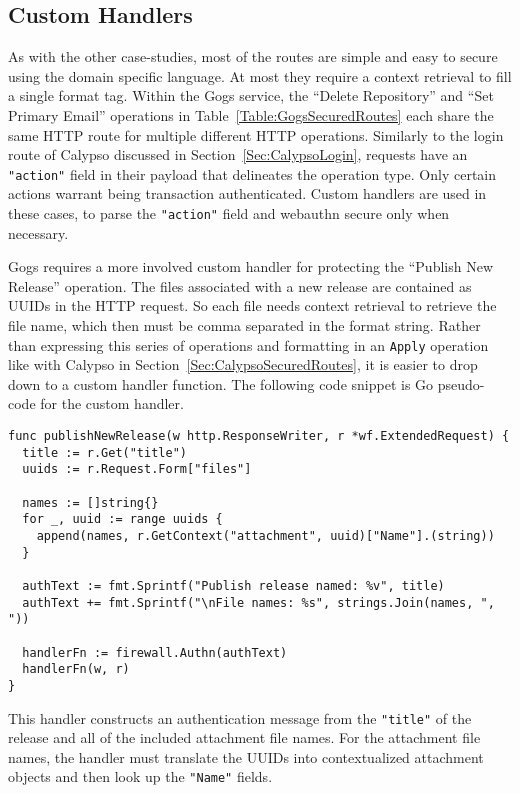 \subsection{Custom Handlers}\label{Sec:Gogs_CustomHandlers}

As with the other case-studies, most of the routes are simple and easy to secure using the domain specific language. At most they require a context retrieval to fill a single format tag. Within the Gogs service, the ``Delete Repository'' and ``Set Primary Email'' operations in Table~\ref{Table:GogsSecuredRoutes} each share the same HTTP route for multiple different HTTP operations. Similarly to the login route of Calypso discussed in Section~\ref{Sec:CalypsoLogin}, requests have an \lstinline{"action"} field in their payload that delineates the operation type. Only certain actions warrant being transaction authenticated. Custom handlers are used in these cases, to parse the \lstinline{"action"} field and webauthn secure only when necessary.



Gogs requires a more involved custom handler for protecting the ``Publish New Release'' operation. The files associated with a new release are contained as UUIDs in the HTTP request. So each file needs context retrieval to retrieve the file name, which then must be comma separated in the format string. Rather than expressing this series of operations and formatting in an \lstinline{Apply} operation like with Calypso in Section~\ref{Sec:CalypsoSecuredRoutes}, it is easier to drop down to a custom handler function. The following code snippet is Go pseudo-code for the custom handler.

\begin{lstlisting}[float=h]
func publishNewRelease(w http.ResponseWriter, r *wf.ExtendedRequest) {
  title := r.Get("title")
  uuids := r.Request.Form["files"]

  names := []string{}
  for _, uuid := range uuids {
    append(names, r.GetContext("attachment", uuid)["Name"].(string))
  }

  authText := fmt.Sprintf("Publish release named: %v", title)
  authText += fmt.Sprintf("\nFile names: %s", strings.Join(names, ", "))

  handlerFn := firewall.Authn(authText)
  handlerFn(w, r)
}
\end{lstlisting}

This handler constructs an authentication message from the \lstinline{"title"} of the release and all of the included attachment file names. For the attachment file names, the handler must translate the UUIDs into contextualized attachment objects and then look up the \lstinline{"Name"} fields.


